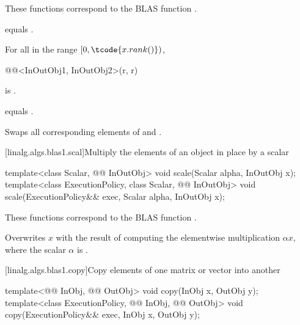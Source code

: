 \begin{itemdescr}
\pnum
\begin{note}
These functions correspond to the BLAS function \supercite{blas1}.
\end{note}

\pnum
\constraints
{} equals .

\pnum
\mandates
For all  in the range $[0, \tcode{x.rank()})$,
\begin{codeblock}
@@<InOutObj1, InOutObj2>(r, r)
\end{codeblock}
is .

\pnum
\expects
{} equals .

\pnum
\effects
Swaps all corresponding elements of  and .
\end{itemdescr}

[linalg.algs.blas1.scal]{Multiply the elements of an object in place by a scalar}

%
\begin{itemdecl}
template<class Scalar, @@ InOutObj>
  void scale(Scalar alpha, InOutObj x);
template<class ExecutionPolicy, class Scalar, @@ InOutObj>
  void scale(ExecutionPolicy&& exec, Scalar alpha, InOutObj x);
\end{itemdecl}

\begin{itemdescr}
\pnum
\begin{note}
These functions correspond to the BLAS function \supercite{blas1}.
\end{note}

\pnum
\effects
Overwrites $x$ with the result of
computing the elementwise multiplication $\alpha x$,
where the scalar $\alpha$ is .
\end{itemdescr}

[linalg.algs.blas1.copy]{Copy elements of one matrix or vector into another}

%
\begin{itemdecl}
template<@@ InObj, @@ OutObj>
  void copy(InObj x, OutObj y);
template<class ExecutionPolicy, @@ InObj, @@ OutObj>
  void copy(ExecutionPolicy&& exec, InObj x, OutObj y);
\end{itemdecl}

